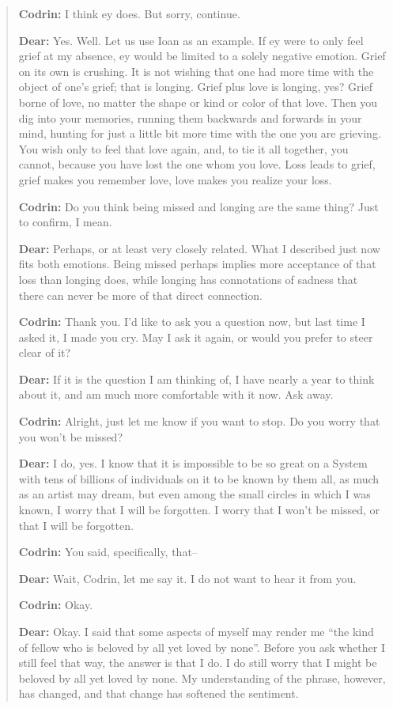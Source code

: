 \begin{quote}
\textbf{Codrin:} I think ey does. But sorry, continue.

\textbf{Dear:} Yes. Well. Let us use Ioan as an example. If ey were to only feel grief at my absence, ey would be limited to a solely negative emotion. Grief on its own is crushing. It is not wishing that one had more time with the object of one's grief; that is longing. Grief plus love is longing, yes? Grief borne of love, no matter the shape or kind or color of that love. Then you dig into your memories, running them backwards and forwards in your mind, hunting for just a little bit more time with the one you are grieving. You wish only to feel that love again, and, to tie it all together, you cannot, because you have lost the one whom you love. Loss leads to grief, grief makes you remember love, love makes you realize your loss.

\textbf{Codrin:} Do you think being missed and longing are the same thing? Just to confirm, I mean.

\textbf{Dear:} Perhaps, or at least very closely related. What I described just now fits both emotions. Being missed perhaps implies more acceptance of that loss than longing does, while longing has connotations of sadness that there can never be more of that direct connection.

\textbf{Codrin:} Thank you. I'd like to ask you a question now, but last time I asked it, I made you cry. May I ask it again, or would you prefer to steer clear of it?

\textbf{Dear:} If it is the question I am thinking of, I have nearly a year to think about it, and am much more comfortable with it now. Ask away.

\textbf{Codrin:} Alright, just let me know if you want to stop. Do you worry that you won't be missed?

\textbf{Dear:} I do, yes. I know that it is impossible to be so great on a System with tens of billions of individuals on it to be known by them all, as much as an artist may dream, but even among the small circles in which I was known, I worry that I will be forgotten. I worry that I won't be missed, or that I will be forgotten.

\textbf{Codrin:} You said, specifically, that--

\textbf{Dear:} Wait, Codrin, let me say it. I do not want to hear it from you.

\textbf{Codrin:} Okay.

\textbf{Dear:} Okay. I said that some aspects of myself may render me ``the kind of fellow who is beloved by all yet loved by none''. Before you ask whether I still feel that way, the answer is that I do. I do still worry that I might be beloved by all yet loved by none. My understanding of the phrase, however, has changed, and that change has softened the sentiment.


\end{quote}
